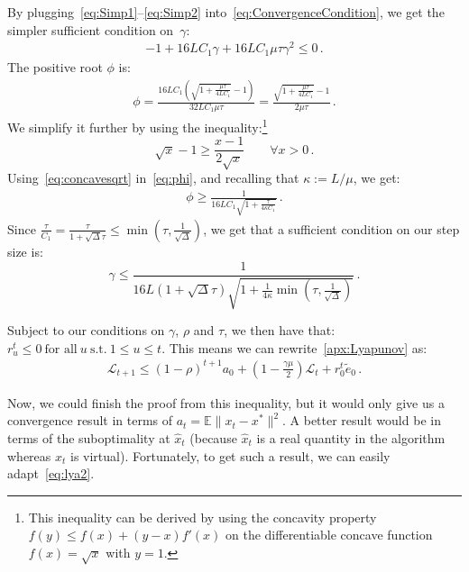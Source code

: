 \documentclass[twoside, 11pt]{article}
\newcommand{\stepsize}{\gamma}
\newcommand{\strongconvex}{\mu}
\newcommand{\overlap}{\tau}
\newcommand{\contraction}{\rho}
\newcommand{\sparsity}{\Delta}
\newcommand{\lipschitz}{L}
\newcommand{\lyapunov}{\mathcal{L}}
\newcommand{\E}{\mathbb{E}}
\begin{document}
By plugging~\eqref{eq:Simp1}--\eqref{eq:Simp2} into~\eqref{eq:ConvergenceCondition}, we get the simpler sufficient condition on~$\stepsize$:
\begin{align}
-1 + 16\lipschitz C_1 \stepsize + 16\lipschitz C_1\strongconvex\overlap\stepsize^2 \leq 0 \, .
\end{align}
The positive root $\phi$ is:
\begin{align}\label{eq:phi}
\phi = \frac{16\lipschitz C_1(\sqrt{1 + \frac{\strongconvex\overlap}{4\lipschitz C_1}} -1)}{32 \lipschitz C_1\strongconvex\overlap}
= \frac{\sqrt{1 + \frac{\strongconvex\overlap}{4\lipschitz C_1}} -1}{2\strongconvex\overlap}  \, .
\end{align}
We simplify it further by using the inequality:\footnote{This inequality can be derived by using the concavity property $f(y) \leq f(x) + (y-x) f'(x)$ on the differentiable concave function $f(x)=\sqrt{x}$ with $y=1$.}
\begin{equation}\label{eq:concavesqrt}
\sqrt{x} - 1 \geq \frac{x - 1}{2 \sqrt{x}}  \qquad \forall x > 0 \, .
\end{equation}
Using~\eqref{eq:concavesqrt} in~\eqref{eq:phi}, and recalling that $\kappa := \lipschitz / \strongconvex$, we get:
\begin{align}
\phi \geq \frac{1}{16\lipschitz C_1 \sqrt{1 + \frac{\overlap}{4\kappa C_1}}} \, .
\end{align}
Since $\frac{\overlap}{C_1} = \frac{\overlap}{1 + \sqrt{\sparsity}\overlap} \leq \min(\overlap, \frac{1}{\sqrt{\sparsity}})$, we get that a sufficient condition on our step size is:
\begin{equation}
\stepsize \leq \frac{1}{16\lipschitz (1 + \sqrt{\sparsity} \overlap) \sqrt{1 + \frac{1}{4\kappa} \min(\overlap, \frac{1}{\sqrt{\sparsity}})}}  \, .
\end{equation}

Subject to our conditions on $\stepsize$, $\contraction$ and $\overlap$, we then have that: $r_u^t \leq 0\ \text{for all}\ u\ \text{s.t.}\ 1 \leq u \leq t$.
This means we can rewrite~\eqref{apx:Lyapunov} as:
\begin{align}\label{eq:lya2}
\lyapunov_{t+1} \leq (1 - \contraction)^{t+1}a_0 + (1-\frac{\stepsize\strongconvex}{2})\lyapunov_t + r_0^t \tilde e_0  \, .
\end{align}

Now, we could finish the proof from this inequality, but it would only give us a convergence result in terms of $a_t = \E \|x_t - x^*\|^2$. A better result would be in terms of the suboptimality at $\hat x_t$ (because $\hat x_t$ is a real quantity in the algorithm whereas $x_t$ is virtual). Fortunately, to get such a result, we can easily adapt~\eqref{eq:lya2}.
\end{document}
